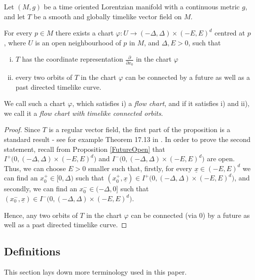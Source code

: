 \documentclass[reqno]{article}
\newcommand{\ux}{\underline{x}}
\begin{document}
\begin{proposition}
\label{FlowChart}
Let $(M,g)$ be a time oriented Lorentzian manifold with a continuous metric $g$, and let $T$ be a smooth and globally timelike vector field on $M$. 

For every $p \in M$ there exists a chart $\varphi : U \to (-\Delta, \Delta) \times (-E, E)^d$ centred at $p$, where $U$ is an open neighbourhood of $p$ in $M$, and $\Delta, E >0$, such that
\begin{enumerate}[i)]
\item $T$ has the coordinate representation $\frac{\partial}{\partial x_0}$ in the chart $\varphi$
\item every two orbits of $T$ in the chart $\varphi$ can be connected by a future as well as a past directed timelike curve.
\end{enumerate}
We call such a chart $\varphi$, which satisfies i) a \emph{flow chart}, and if it satisfies i) and ii), we call it a \emph{flow chart with timelike connected orbits}.
\end{proposition}

\begin{proof}
Since $T$ is a regular vector field, the first part of the proposition is a standard result - see for example Theorem 17.13 in \cite{LeeSmooth}. In order to prove the second statement, recall from Proposition \ref{FutureOpen} that $I^+\big(0, (-\Delta, \Delta) \times (-E, E)^d\big)$ and $I^-\big(0,  (-\Delta, \Delta) \times (-E, E)^d\big)$ are open. Thus, we can choose $E>0$ smaller such that, firstly, for every $\ux \in  (-E, E)^d$ we can find an $x_0^+ \in [0,\Delta)$ such that $(x_0^+, \ux) \in I^+\big(0, (-\Delta, \Delta) \times (-E, E)^d\big)$, and secondly, we can find an $x_0^- \in (-\Delta ,0]$ such that $(x_0^-, \ux) \in I^-\big(0,  (-\Delta, \Delta) \times (-E, E)^d\big)$. 
\begin{center}
\def\svgwidth{7cm}

\end{center} 
Hence, any two orbits of $T$ in the chart $\varphi$ can be connected (via $0$) by a future as well as a past directed timelike curve. 
\end{proof}



\subsection{Definitions}

This section lays down more terminology used in this paper.
\end{document}

